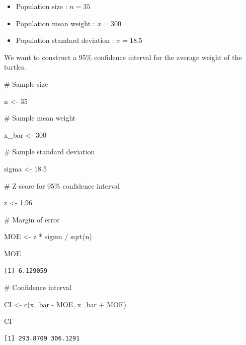 \documentclass[
  letterpaper,
  DIV=11,
  numbers=noendperiod]{scrreprt}
\newenvironment{Shaded}{\begin{snugshade}}{\end{snugshade}}
\newcommand{\CommentTok}[1]{\textcolor[rgb]{0.37,0.37,0.37}{#1}}
\newcommand{\DecValTok}[1]{\textcolor[rgb]{0.68,0.00,0.00}{#1}}
\newcommand{\FloatTok}[1]{\textcolor[rgb]{0.68,0.00,0.00}{#1}}
\newcommand{\FunctionTok}[1]{\textcolor[rgb]{0.28,0.35,0.67}{#1}}
\newcommand{\NormalTok}[1]{\textcolor[rgb]{0.00,0.23,0.31}{#1}}
\newcommand{\OtherTok}[1]{\textcolor[rgb]{0.00,0.23,0.31}{#1}}
\newcommand{\SpecialCharTok}[1]{\textcolor[rgb]{0.37,0.37,0.37}{#1}}
\providecommand{\tightlist}{%
  \setlength{\itemsep}{0pt}\setlength{\parskip}{0pt}}\usepackage{longtable,booktabs,array}
\begin{document}
\begin{itemize}
\tightlist
\item
  Population size : \(n=35\)
\item
  Population mean weight : \(\bar{x} = 300\)
\item
  Population standard deviation : \(\sigma = 18.5\)
\end{itemize}

We want to construct a 95\% confidence interval for the average weight
of the turtles.

\begin{Shaded}
\begin{Highlighting}[]
\CommentTok{\# Sample size}

\NormalTok{n }\OtherTok{\textless{}{-}} \DecValTok{35}

\CommentTok{\# Sample mean weight}

\NormalTok{x\_bar }\OtherTok{\textless{}{-}} \DecValTok{300}

\CommentTok{\# Sample standard deviation}

\NormalTok{sigma }\OtherTok{\textless{}{-}} \FloatTok{18.5}

\CommentTok{\# Z{-}score for 95\% confidence interval}

\NormalTok{z }\OtherTok{\textless{}{-}} \FloatTok{1.96}

\CommentTok{\# Margin of error}

\NormalTok{MOE }\OtherTok{\textless{}{-}}\NormalTok{ z }\SpecialCharTok{*}\NormalTok{ sigma }\SpecialCharTok{/} \FunctionTok{sqrt}\NormalTok{(n)}

\NormalTok{MOE}
\end{Highlighting}
\end{Shaded}

\begin{verbatim}
[1] 6.129059
\end{verbatim}

\begin{Shaded}
\begin{Highlighting}[]
\CommentTok{\# Confidence interval}

\NormalTok{CI }\OtherTok{\textless{}{-}} \FunctionTok{c}\NormalTok{(x\_bar }\SpecialCharTok{{-}}\NormalTok{ MOE, x\_bar }\SpecialCharTok{+}\NormalTok{ MOE)}

\NormalTok{CI}
\end{Highlighting}
\end{Shaded}

\begin{verbatim}
[1] 293.8709 306.1291
\end{verbatim}
\end{document}
